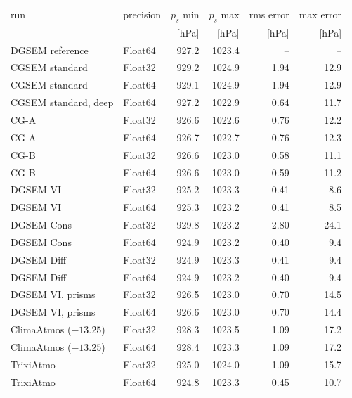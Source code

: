 \documentclass[11pt,a4paper]{article}
\begin{document}
\begin{center}
\small
\begin{tabular}{llrrrr}
\toprule
run & precision & $p_s$ min & $p_s$ max & rms error & max error \\
 & & [hPa] & [hPa] & [hPa] & [hPa] \\
\midrule
DGSEM reference & Float64 & 927.2 & 1023.4 & -- & -- \\
\midrule
CGSEM standard & Float32 & 929.2 & 1024.9 & 1.94 & 12.9 \\
CGSEM standard & Float64 & 929.1 & 1024.9 & 1.94 & 12.9 \\
CGSEM standard, deep & Float64 & 927.2 & 1022.9 & 0.64 & 11.7 \\
CG-A           & Float32 & 926.6 & 1022.6 & 0.76 & 12.2 \\
CG-A           & Float64 & 926.7 & 1022.7 & 0.76 & 12.3 \\
CG-B           & Float32 & 926.6 & 1023.0 & 0.58 & 11.1 \\
CG-B           & Float64 & 926.6 & 1023.0 & 0.59 & 11.2 \\
DGSEM VI       & Float32 & 925.2 & 1023.3 & 0.41 & 8.6 \\
DGSEM VI       & Float64 & 925.3 & 1023.2 & 0.41 & 8.5 \\
DGSEM Cons     & Float32 & 929.8 & 1023.2 & 2.80 & 24.1 \\
DGSEM Cons     & Float64 & 924.9 & 1023.2 & 0.40 & 9.4 \\
DGSEM Diff     & Float32 & 924.9 & 1023.3 & 0.41 & 9.4 \\
DGSEM Diff     & Float64 & 924.9 & 1023.2 & 0.40 & 9.4 \\
DGSEM VI, prisms & Float32 & 926.5 & 1023.0 & 0.70 & 14.5 \\
DGSEM VI, prisms & Float64 & 926.6 & 1023.0 & 0.70 & 14.4 \\
ClimaAtmos ($-13.25$) & Float32 & 928.3 & 1023.5 & 1.09 & 17.2 \\
ClimaAtmos ($-13.25$) & Float64 & 928.4 & 1023.3 & 1.09 & 17.2 \\
TrixiAtmo      & Float32 & 925.0 & 1024.0 & 1.09 & 15.7 \\
TrixiAtmo      & Float64 & 924.8 & 1023.3 & 0.45 & 10.7 \\
\bottomrule
\end{tabular}
\end{center}
\end{document}
